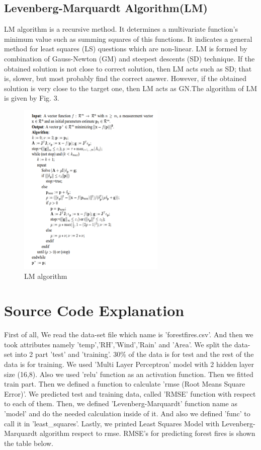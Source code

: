 \documentclass[onecolumn]{article}
\begin{document}
\subsection{Levenberg-Marquardt Algorithm(LM)}
LM algorithm is a recursive method. It determines a multivariate function’s minimum value such as summing squares of this functions. It indicates a general method for least squares (LS) questions which are non-linear. LM is formed by combination of Gauss-Newton (GM) and steepest descents (SD) technique. If the obtained solution is not close to correct solution, then LM acts such as SD; that is, slower, but most probably find the correct answer. However, if the obtained solution is very close to the target one, then LM acts as GN.The algorithm of LM is given by Fig. 3. 
\begin{figure}[htb!]
\centerline
{\includegraphics[width=70mm,scale=1.0]{lm.png}}
\caption{LM algorithm}
\end{figure}


\section{Source Code Explanation}
First of all, We read the data-set file which name is 'forestfires.csv'. And then we took attributes namely 'temp','RH','Wind','Rain' and 'Area'. We split the data-set into 2 part 'test' and 'training'. 30\% of the data is for test and the rest of the data is for training. We used 'Multi Layer Perceptron' model with 2 hidden layer size (16,8). Also we used 'relu' function as an activation function.
Then we fitted train part. Then we defined a function to calculate 'rmse (Root Means Square Error)'. We predicted test and training data, called 'RMSE' function with respect to each of them. Then, we defined  'Levenberg-Marquardt' function name as 'model' and do the needed calculation inside of it. And also we defined 'func' to call it in 'least\_squares'. Lastly, we printed Least Squares Model with Levenberg-Marquardt algorithm respect to rmse. RMSE’s for predicting forest fires is shown the table below.
\end{document}

